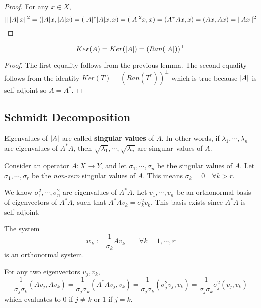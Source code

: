 \begin{proof}
For any $x \in X$, 
$$\lVert\: \lvert A\rvert \: x\rVert^{2} = (\lvert A\rvert x, \lvert A\rvert x) = (\lvert A\rvert^{*} \lvert A\rvert x, x) = (\lvert A\rvert^{2} x, x) = (A^{*} A x, x) = (Ax, Ax) = \lVert Ax\rVert^{2}$$
\end{proof}

\begin{theorem}
$$Ker(A) = Ker(\lvert A\rvert) = (Ran(\lvert A\rvert))^{\perp}$$
\end{theorem}

\begin{proof}
The first equality follows from the previous lemma. The second equality follows from the identity $Ker(T) = (Ran(T^{*}))^{\perp}$ which is true because $\lvert A\rvert$ is self-adjoint so $A = A^{*}$. 
\end{proof}

\subsection{Schmidt Decomposition}

\begin{definition}
Eigenvalues of $\lvert A\rvert$ are called \textbf{singular values} of $A$. In other words, if $\lambda_{1}, \cdots, \lambda_{n}$ are eigenvalues of $A^{*}A$, then $\sqrt{\lambda_{1}}, \cdots, \sqrt{\lambda_{n}}$ are singular values of $A$. 
\end{definition}

Consider an operator $A : X \rightarrow Y$, and let $\sigma_{1}, \cdots, \sigma_{n}$ be the singular values of $A$. Let $\sigma_{1}, \cdots, \sigma_{r}$ be the \textit{non-zero} singular values of $A$. This means $\sigma_{k} = 0 \quad \forall k > r$. 

We know $\sigma_{1}^{2}, \cdots, \sigma_{n}^{2}$ are eigenvalues of $A^{*}A$. Let $v_{1}, \cdots, v_{n}$ be an orthonormal basis of eigenvectors of $A^{*}A$, such that $A^{*}Av_{k} = \sigma_{k}^{2} v_{k}$. This basis exists since $A^{*}A$ is self-adjoint. 

\begin{lemma}
The system 
$$w_{k} := \frac{1}{\sigma_{k}} Av_{k} \qquad \forall k = 1, \cdots, r$$
is an orthonormal system. 
\end{lemma}

\begin{lproof}
For any two eigenvectors $v_{j}, v_{k}$, 
$$\frac{1}{\sigma_{j} \sigma_{k}} (Av_{j}, Av_{k}) = \frac{1}{\sigma_{j} \sigma_{k}} (A^{*} Av_{j}, v_{k}) = \frac{1}{\sigma_{j} \sigma_{k}} (\sigma_{j}^{2} v_{j}, v_{k}) = \frac{1}{\sigma_{j} \sigma_{k}} \sigma_{j}^{2} (v_{j}, v_{k})$$
which evaluates to 0 if $j \neq k$ or $1$ if $j = k$. 
\end{lproof}

